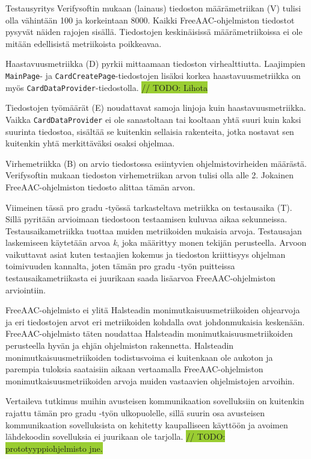 \documentclass[utf8]{gradu3}
\begin{document}
Testausyritys Verifysoftin mukaan (lainaus) tiedoston määrämetriikan (V) tulisi olla vähintään 100 ja korkeintaan 8000. Kaikki FreeAAC-ohjelmiston tiedostot pysyvät näiden rajojen sisällä. Tiedostojen keskinäisissä määrämetriikoissa ei ole mitään edellisistä metriikoista poikkeavaa.

Haastavuusmetriikka (D) pyrkii mittaamaan tiedoston virhealttiutta. Laajimpien \texttt{MainPage}- ja \texttt{CardCreatePage}-tiedostojen lisäksi korkea haastavuusmetriikka on myös \texttt{CardDataProvider}-tiedostolla.
\colorbox{YellowGreen}{// TODO: Lihota}

Tiedostojen työmäärät (E) noudattavat samoja linjoja kuin haastavuusmetriikka. Vaikka \texttt{CardDataProvider} ei ole sanastoltaan tai kooltaan yhtä suuri kuin kaksi suurinta tiedostoa, sisältää se kuitenkin sellaisia rakenteita, jotka nostavat sen kuitenkin yhtä merkittäväksi osaksi ohjelmaa.

Virhemetriikka (B) on arvio tiedostossa esiintyvien ohjelmistovirheiden määrästä. Verifysoftin mukaan tiedoston virhemetriikan arvon tulisi olla alle 2. Jokainen FreeAAC-ohjelmiston tiedosto alittaa tämän arvon.

Viimeinen tässä pro gradu -työssä tarkasteltava metriikka on testausaika (T). Sillä pyritään arvioimaan tiedostoon testaamisen kuluvaa aikaa sekunneissa. Testausaikametriikka tuottaa muiden metriikoiden mukaisia arvoja. Testausajan laskemiseen käytetään arvoa \textit{k}, joka määrittyy monen tekijän perusteella. Arvoon vaikuttavat asiat kuten testaajien kokemus ja tiedoston kriittisyys ohjelman toimivuuden kannalta, joten tämän pro gradu -työn puitteissa testausaikametriikasta ei juurikaan saada lisäarvoa FreeAAC-ohjelmiston arviointiin.

FreeAAC-ohjelmisto ei ylitä Halsteadin monimutkaisuusmetriikoiden ohjearvoja ja eri tiedostojen arvot eri metriikoiden kohdalla ovat johdonmukaisia keskenään. FreeAAC-ohjelmisto täten noudattaa Halsteadin monimutkaisuusmetriikoiden perusteella hyvän ja ehjän ohjelmiston rakennetta. Halsteadin monimutkaisuusmetriikoiden todistusvoima ei kuitenkaan ole aukoton ja parempia tuloksia saataisiin aikaan vertaamalla FreeAAC-ohjelmiston monimutkaisuusmetriikoiden arvoja muiden vastaavien ohjelmistojen arvoihin. 

Vertaileva tutkimus muihin avusteisen kommunikaation sovelluksiin on kuitenkin rajattu tämän pro gradu -työn ulkopuolelle, sillä suurin osa avusteisen kommunikaation sovelluksista on kehitetty kaupalliseen käyttöön ja avoimen lähdekoodin sovelluksia ei juurikaan ole tarjolla.
\colorbox{YellowGreen}{// TODO: prototyyppiohjelmisto jne.}
\end{document}
